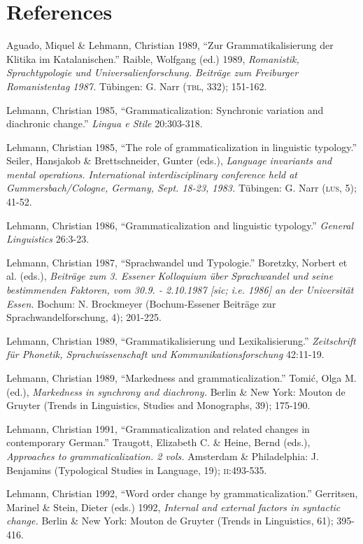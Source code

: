 \section {References}
Aguado, Miquel \& Lehmann, Christian 1989, “Zur Grammatikalisierung der Klitika im Katalanischen.” Raible, Wolfgang (ed.) 1989, \textit{Romanistik, Sprachtypologie und Universalienforschung. Beiträge zum Freiburger Romanistentag 1987.} Tübingen: G. Narr (\textsc{tbl}, 332); 151-162.

Lehmann, Christian 1985, “Grammaticalization: Synchronic variation and diachronic change.” \textit{Lingua e Stile} 20:303-318.

Lehmann, Christian 1985, “The role of grammaticalization in linguistic typology.” Seiler, Hansjakob \& Brettschneider, Gunter (eds.), \textit{Language invariants and mental operations. International interdisciplinary conference held at Gummersbach/Cologne, Germany, Sept. 18-23, 1983.} Tübingen: G. Narr (\textsc{lus}, 5); 41-52.

Lehmann, Christian 1986, “Grammaticalization and linguistic typology.” \textit{General Linguistics} 26:3-23.

Lehmann, Christian 1987, “Sprachwandel und Typologie.” Boretzky, Norbert et al. (eds.), \textit{Beiträge zum 3. Essener Kolloquium über Sprachwandel und seine bestimmenden Faktoren, vom 30.9. - 2.10.1987 [sic; i.e. 1986] an der Universität Essen.} Bochum: N. Brockmeyer (Bochum-Essener Beiträge zur Sprachwandelforschung, 4); 201-225.

Lehmann, Christian 1989, “Grammatikalisierung und Lexikalisierung.” \textit{Zeitschrift für Phonetik, Sprachwissenschaft und Kommunikationsforschung} 42:11-19.

Lehmann, Christian 1989, “Markedness and grammaticalization.” Tomić, Olga M. (ed.), \textit{Markedness in synchrony and diachrony.} Berlin \& New York: Mouton de Gruyter (Trends in Linguistics, Studies and Monographs, 39); 175-190.

Lehmann, Christian 1991, “Grammaticalization and related changes in contemporary German.” Traugott, Elizabeth C. \& Heine, Bernd (eds.), \textit{Approaches to grammaticalization. 2 vols.} Amsterdam \& Philadelphia: J. Benjamins (Typological Studies in Language, 19); \textsc{ii}:493-535.

Lehmann, Christian 1992, “Word order change by grammaticalization.” Gerritsen, Marinel \& Stein, Dieter (eds.) 1992, \textit{Internal and external factors in syntactic change.} Berlin \& New York: Mouton de Gruyter (Trends in Linguistics, 61); 395-416.

